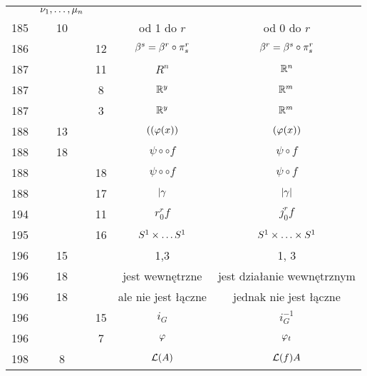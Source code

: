 \documentclass[a4paper,11pt]{article}
\begin{document}
\begin{center}
\begin{tabular}{|c|c|c|c|c|}
           & $\nu_{ 1 }, \ldots, \mu_{ n }$ \\
    185 & 10 & & od 1 do $r$ & od 0 do $r$ \\
    186 & & 12 & $\beta^{ s } = \beta^{ r } \circ \pi^{ r }_{ s }$
           & $\beta^{ r } = \beta^{ s } \circ \pi^{ r }_{ s }$ \\
    187 & & 11 & $R^{ n }$ & $\mathbb{R}^{ n }$ \\
    187 & &  8 & $\mathbb{R}^{ y }$ & $\mathbb{R}^{ m }$ \\
    187 & &  3 & $\mathbb{R}^{ y }$ & $\mathbb{R}^{ m }$ \\
    188 & 13 & & $( ( \varphi( x ) )$ & $( \varphi( x ) )$ \\
    188 & 18 & & $\psi \circ \circ f$ & $\psi \circ f$ \\
    188 & & 18 & $\psi \circ \circ f$ & $\psi \circ f$ \\
    188 & & 17 & $| \gamma$ & $| \gamma |$ \\
    194 & & 11 & $r^{ r }_{ 0 }f$ & $j^{ r }_{ 0 }f$ \\
    195 & & 16 & $S^{ 1 } \times \ldots S^{ 1 }$ & $S^{ 1 } \times \ldots \times S^{ 1 }$ \\
    196 & 15 & & 1,3 & 1, 3 \\
    196 & 18 & & jest wewnętrzne & jest działanie wewnętrznym \\
    196 & 18 & & ale nie jest łączne & jednak nie jest łączne \\
    196 & & 15 & $i_{ G }$ & $i_{ G }^{ -1 }$ \\
    196 & &  7 & $\varphi$ & $\varphi_{ t }$ \\
    198 &  8 & & $\mathcal{L}( A )$ & $\mathcal{L}( f )A$ \\
    \hline
  \end{tabular}


\end{center}
\end{document}
